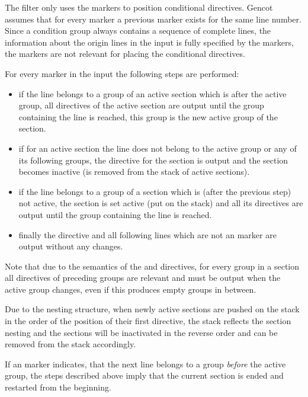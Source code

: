 The filter only uses the  markers to position conditional directives. Gencot assumes that for every 
 marker a previous  marker exists for the same line number. Since a condition group
always contains a sequence of complete lines, the information about the origin lines in the input is fully specified
by the  markers, the  markers are not relevant for placing the conditional directives.

For every  marker in the input the following steps are performed:
\begin{itemize}
\item if the line belongs to a group of an active section which is after the active group, all directives of the active
section are output until the group containing the line is reached, this group is the new active group of the section.
\item if for an active section the line does not belong to the active group or any of its following groups, 
the  directive for the 
section is output and the section becomes inactive (is removed from the stack of active sections).
\item if the line belongs to a group of a section which is (after the previous step) not active, the section is set 
active (put on the stack) and all its directives are output until the group containing the line is reached.
\item finally the  directive and all following lines which are not an  marker
are output without any changes.
\end{itemize}

Note that due to the semantics of the  and  directives, for every group in a section all
directives of preceding groups are relevant and must be output when the active group changes, even if this produces 
empty groups in between.

Due to the nesting structure, when newly active sections are pushed on the stack in the order of the position of their
first directive, the stack reflects the section nesting and the sections will be inactivated in the reverse order and
can be removed from the stack accordingly.

If an  marker indicates, that the next line belongs to a group \textit{before} the active group, the
steps described above imply that the current section is ended and restarted from the beginning.

